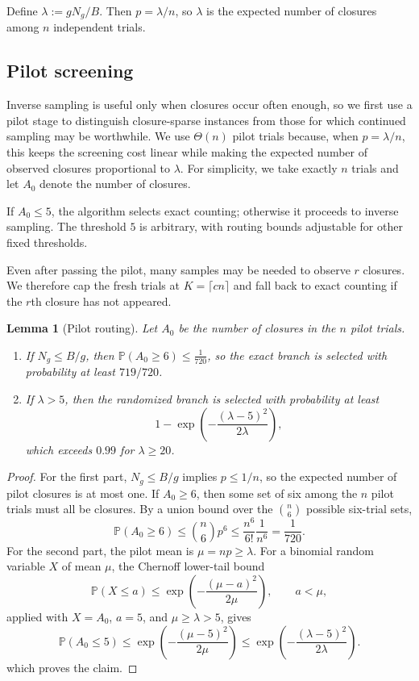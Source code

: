 \documentclass[conference]{IEEEtran}
\newtheorem{lemma}{Lemma}
\newcommand{\Prb}{\mathbb{P}}
\begin{document}
Define $\lambda:=gN_g/B$.  Then $p=\lambda/n$, so $\lambda$ is the
expected number of closures among $n$ independent trials.

\subsection{Pilot screening}
Inverse sampling is useful only when closures occur often enough, so we first
use a pilot stage to distinguish closure-sparse instances from those for
which continued sampling may be worthwhile. We use $\Theta(n)$ pilot trials
because, when $p=\lambda/n$, this keeps the screening cost linear while
making the expected number of observed closures proportional to $\lambda$.
For simplicity, we take exactly $n$ trials and let $A_0$ denote the number
of closures. 

If $A_0\le5$, the algorithm selects exact counting;
otherwise it proceeds to inverse sampling.
The threshold $5$ is arbitrary, with routing bounds
adjustable for other fixed thresholds.

Even after passing the pilot, many samples may be needed to observe \(r\)
closures. We therefore cap the fresh trials at \(K=\lceil cn\rceil\) and fall
back to exact counting if the \(r\)th closure has not appeared.

\begin{lemma}[Pilot routing]\label{lem:pilot}
Let $A_0$ be the number of closures in the $n$ pilot trials.
\begin{enumerate}
\item If $N_g\le B/g$, then $\Prb(A_0\ge6)\le \frac1{720}$,
so the exact branch is selected with probability at least $719/720$.
\item If $\lambda>5$, then the randomized branch is selected with probability
at least
\[
1-\exp\!\left(-\frac{(\lambda-5)^2}{2\lambda}\right),
\]
which exceeds $0.99$ for $\lambda\ge20$.
\end{enumerate}
\end{lemma}

\begin{proof}
For the first part, $N_g\le B/g$ implies $p\le1/n$, so the expected number
of pilot closures is at most one.  If $A_0\ge6$, then some set of six among
the $n$ pilot trials must all be closures.  By a union bound over the
$\binom n6$ possible six-trial sets,
\[
\Prb(A_0\ge6)\le\binom n6 p^6 \le\frac{n^6}{6!}\frac1{n^6}=\frac1{720}.
\]
For the second part, the pilot mean is $\mu=np\ge\lambda$.
For a binomial random variable $X$ of mean $\mu$, the Chernoff lower-tail
bound
\[
\Prb(X\le a)\le
\exp\!\left(-\frac{(\mu-a)^2}{2\mu}\right),
\qquad a<\mu,
\]
applied with $X=A_0$, $a=5$, and $\mu\ge\lambda>5$, gives
\[
\Prb(A_0\le5)\le
\exp\!\left(-\frac{(\mu-5)^2}{2\mu}\right)
\le
\exp\!\left(-\frac{(\lambda-5)^2}{2\lambda}\right).
\]
which proves the claim.
\end{proof}
\end{document}
